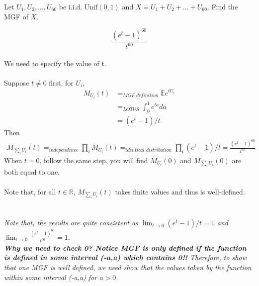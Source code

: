 
\setcounter{theorem}{13}
\begin{exercise} [BH.6.14] Let $U_1, U_2, \ldots, U_{60}$ be i.i.d. $\text{Unif}(0,1)$ and $X = U_1 + U_2 + \ldots + U_{60}$. Find the MGF of $X$.
\begin{solution}
  \[\frac{\left(e^t -1 \right)^{60}}{t^{60}} \]~\\
	We need to specify the value of t. \\~\\
	Suppose $t\neq 0$ first,
	for $U_i$,
	\begin{align*}
		M_{U_i}(t) &=_{\textit{MGF definition}}  \mathbb{E}e^{tU_i} \\
		&=_{\textit{LOTUS}} \int_{0}^{1} e^{ta} da \\
		&= (e^t-1)/t  
	\end{align*}
	Then 
	\begin{align*}
		M_{\sum_i U_i}(t) =_{\textit{independence}} \prod_i M_{ U_i}(t) =_{\textit{identical distribution}}  \prod_i (e^t-1)/t = \frac{\left(e^t -1 \right)^{60}}{t^{60}} 
	\end{align*}
	When $t=0$, follow the same step, you will find $M_{U_i}(0)$ and $M_{\sum_i U_i}(0)$ are both equal to one. \\~\\
	Note that, for all $t\in \mathbb{R}$, $M_{\sum_i U_i}(t)$ takes finite values and thus is well-defined. 
	\\~\\~\\
	
	\textit{Note that, the results are quite consistent as $\lim_{t\rightarrow 0} (e^t-1)/t =1  $  and $\lim_{t\rightarrow 0} \frac{\left(e^t -1 \right)^{60}}{t^{60}}  =1  $.\\ \textbf{Why we need to check 0? Notice MGF is only defined if the function is defined in some interval (-a,a) which contains 0!!} Therefore, to show that one MGF is well defined, we need show that the values taken by the function within some interval (-a,a) for $a >0$.}
\end{solution}


\end{exercise}

